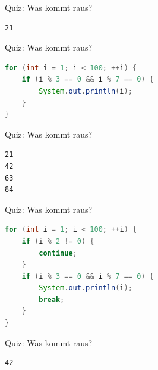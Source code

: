 \documentclass[18pt]{beamer}
\begin{document}
\begin{frame}[fragile]{Quiz: Was kommt raus?}
    \begin{block}{}
        \begin{lstlisting}
21
        \end{lstlisting}
    \end{block}
\end{frame}
\begin{frame}[fragile]{Quiz: Was kommt raus?}
    \begin{exampleblock}{}
        \begin{lstlisting}[language=Java]
for (int i = 1; i < 100; ++i) {
    if (i % 3 == 0 && i % 7 == 0) {
        System.out.println(i);
    }
}
        \end{lstlisting}
    \end{exampleblock}
\end{frame}

\begin{frame}[fragile]{Quiz: Was kommt raus?}
    \begin{block}{}
        \begin{lstlisting}
21
42
63
84
        \end{lstlisting}
    \end{block}
\end{frame}
\begin{frame}[fragile]{Quiz: Was kommt raus?}
    \begin{exampleblock}{}
        \begin{lstlisting}[language=Java]
for (int i = 1; i < 100; ++i) {
    if (i % 2 != 0) {
        continue;
    }
    if (i % 3 == 0 && i % 7 == 0) {
        System.out.println(i);
        break;
    }
}
        \end{lstlisting}
    \end{exampleblock}
\end{frame}

\begin{frame}[fragile]{Quiz: Was kommt raus?}
    \begin{block}{}
        \begin{lstlisting}
42
        \end{lstlisting}
    \end{block}
\end{frame}
\end{document}
